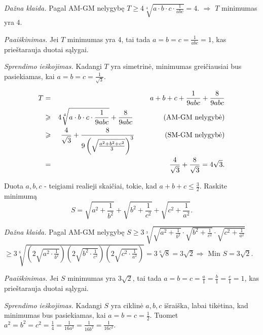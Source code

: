 \noindent \textit{Dažna klaida.} Pagal AM-GM nelygybę
$T\geq4\sqrt[4]{a\cdot b\cdot c\cdot \frac{1}{abc}}=4.$ $\Rightarrow$ $T$
minimumas yra 4.

\noindent \textit{Paaiškinimas.} Jei $T$ minimumas yra 4, tai tada
$a=b=c=\frac{1}{abc}=1$, kas prieštarauja duotai sąlygai.

\noindent \textit{Sprendimo ieškojimas.} Kadangi $T$ yra simetrinė,
minimumas greičiausiai bus pasiekiamas, kai $a=b=c=\frac{1}{\sqrt{3}}.$

\begin{sprendimas}
  \begin{eqnarray*}T&=&a+b+c+\frac{1}{9abc}+\frac{8}{9abc}\\
    &\geq & 4 \sqrt[4]{a\cdot b\cdot c\cdot \frac{1}{9abc}}+\frac{8}{9abc}
    \hspace{1.5 cm} \mbox{(AM-GM nelygybė)}\\ &\geq
    &\frac{4}{\sqrt{3}}+\frac{8}{9\left(\sqrt{\frac{a^2+b^2+c^2}{3}}\right)^3}
    \hspace{1.5 cm} \mbox{(SM-GM nelygybė)}\\
    &=&\frac{4}{\sqrt{3}}+\frac{8}{\sqrt{3}}=4\sqrt{3}.
  \end{eqnarray*}
\end{sprendimas}

\begin{pavnr}
  Duota $a,b,c$ - teigiami realieji skaičiai, tokie, kad
  $a+b+c\leq\frac{3}{2}$. Raskite minimumą
  $$S=\sqrt{a^2+\frac{1}{b^2}}+\sqrt{b^2+\frac{1}{c^2}}+\sqrt{c^2+\frac{1}{a^2}}.$$
\end{pavnr}

\noindent\textit{Dažna klaida.} Pagal AM-GM nelygybę
$S\geq3\sqrt[3]{\sqrt{a^2+\frac{1}{b^2}}\cdot\sqrt{b^2+\frac{1}{c^2}}\cdot\sqrt{c^2+\frac{1}{a^2}}}$\\
$\geq3\sqrt[6]{\left(2\sqrt{a^2\cdot\frac{1}{b^2}}\right)\left(2\sqrt{b^2\cdot\frac{1}{c^2}}\right)\left(2\sqrt{c^2\cdot\frac{1}{a^2}}\right)}=3\sqrt[6]{8}=3\sqrt{2}\Rightarrow$
Min $S=3\sqrt{2}.$

\noindent \textit{Paaiškinimas.} Jei $S$ minimumas yra $3\sqrt{2}$, tai
tada $a=b=c=\frac{a}{1}=\frac{b}{1}=\frac{c}{1}=1$, kas prieštarauja duotai
sąlygai.

\noindent \textit{Sprendimo ieškojimas.} Kadangi $S$ yra ciklinė $a,b,c$
išraiška, labai tikėtina, kad minimumas bus pasiekiamas, kai
$a=b=c=\frac{1}{2}.$ Tuomet
$a^2=b^2=c^2=\frac{1}{4}=\frac{1}{16a^2}=\frac{1}{16b^2}=\frac{1}{16c^2}.$

